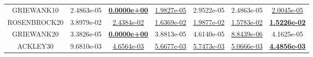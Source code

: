\begin{table}[]
\begin{tabular}{|c|c|c|c|c|c|c|}
GRIEWANK10 &  2.4863e-05 & \underline{\textbf{0.0000e+00}} & \underline{ 1.9827e-05} &  2.9522e-05 &  2.4863e-05 & \underline{ 2.0045e-05}\\  
ROSENBROCK20 &  3.8979e-02 & \underline{ 2.4384e-02} & \underline{ 1.6369e-02} & \underline{ 1.9877e-02} & \underline{ 1.5783e-02} & \underline{\textbf{1.5226e-02}}\\  
GRIEWANK20 &  3.3826e-05 & \underline{\textbf{0.0000e+00}} &  3.8813e-05 &  4.6140e-05 & \underline{ 8.8439e-06} &  4.1625e-05\\  
ACKLEY30 &  9.6810e-03 & \underline{ 4.6564e-03} & \underline{ 5.6677e-03} & \underline{ 5.7473e-03} & \underline{ 5.0666e-03} & \underline{\textbf{4.4856e-03}}\\  
\hline  
\end{tabular}
\end{table}
